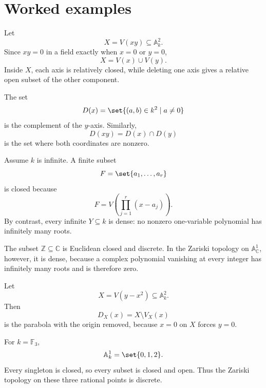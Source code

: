 
\section{Worked examples}
\label{sec:vi02-worked-examples}

\begin{example}
Let
\[
X=V(xy)\subseteq\mathbb A_k^2.
\]
Since \(xy=0\) in a field exactly when \(x=0\) or \(y=0\),
\[
X=V(x)\cup V(y).
\]
Inside \(X\), each axis is relatively closed, while deleting one axis gives a relative open
subset of the other component.
\end{example}

\begin{example}
The set
\[
D(x)=\set{(a,b)\in k^2\mid a\neq0}
\]
is the complement of the \(y\)-axis.  Similarly,
\[
D(xy)=D(x)\cap D(y)
\]
is the set where both coordinates are nonzero.
\end{example}

\begin{example}
Assume \(k\) is infinite.  A finite subset
\[
F=\set{a_1,\dots,a_r}
\]
is closed because
\[
F=V\!\left(\prod_{j=1}^r(x-a_j)\right).
\]
By contrast, every infinite \(Y\subseteq k\) is dense: no nonzero one-variable polynomial
has infinitely many roots.
\end{example}

\begin{example}
The subset \(\mathbb Z\subseteq\mathbb C\) is Euclidean closed and discrete.  In the
Zariski topology on \(\mathbb A^1_{\mathbb C}\), however, it is dense, because a complex
polynomial vanishing at every integer has infinitely many roots and is therefore zero.
\end{example}

\begin{example}
Let
\[
X=V(y-x^2)\subseteq\mathbb A_k^2.
\]
Then
\[
D_X(x)=X\setminus V_X(x)
\]
is the parabola with the origin removed, because \(x=0\) on \(X\) forces \(y=0\).
\end{example}

\begin{example}
For \(k=\mathbb F_3\),
\[
\mathbb A_k^1=\set{0,1,2}.
\]
Every singleton is closed, so every subset is closed and open.  Thus the Zariski topology on
these three rational points is discrete.
\end{example}

